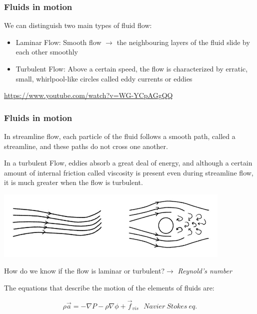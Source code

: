 \documentclass[]{beamer}
\begin{document}

\begin{frame}
  \frametitle{Fluids in motion}

We can distinguish two main types of fluid flow:
\vspace{3mm}

\begin{itemize}
\item Laminar Flow: Smooth flow $\rightarrow$ the neighbouring layers of the fluid slide by each other smoothly
\pause
\item Turbulent Flow: Above a certain speed, the flow is characterized by erratic, small, whirlpool-like circles called eddy currents or
eddies
\end{itemize}

\url{https://www.youtube.com/watch?v=WG-YCpAGgQQ}
  \end{frame}
  



\begin{frame}
\frametitle{Fluids in motion}

In streamline flow, each particle of the fluid follows
a smooth path, called a streamline, and these paths do not cross one another.
\vspace{3mm}

In a turbulent Flow, eddies absorb a great deal of energy, and although a certain
amount of internal friction called viscosity is present even during streamline flow,
it is much greater when the flow is turbulent.


\begin{center}
\includegraphics[height=1.3in]{images2/Fluids.jpg}
\end{center}

\end{frame}

\begin{frame}
 How do we know if the flow is laminar or turbulent?\pause $\rightarrow$ \textit{Reynold's number}
  \pause
  \vspace{3mm}
  
  The equations that describe the motion of the elements of fluids are:

  \begin{equation*}
    \boxed{\rho \vec{a}=-\nabla P-\rho \nabla \phi +\vec{f}_{vis}} ~~~Navier~ Stokes~eq.
    \end{equation*}

  \end{frame}
\end{document}
